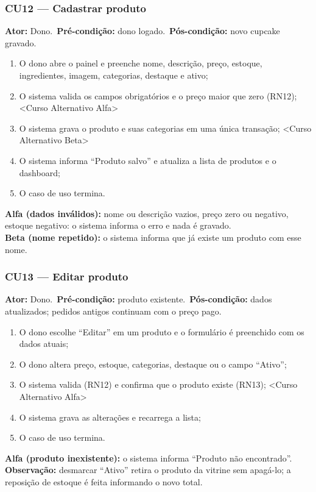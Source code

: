 \documentclass[12pt]{article}
\begin{document}
\subsubsection{CU12 --- Cadastrar produto}
\textbf{Ator:} Dono.\ \textbf{Pré-condição:} dono logado.\ \textbf{Pós-condição:} novo cupcake gravado.
\begin{enumerate}[nosep]
\item O dono abre o painel e preenche nome, descrição, preço, estoque, ingredientes, imagem, categorias, destaque e ativo;
\item O sistema valida os campos obrigatórios e o preço maior que zero (RN12); <Curso Alternativo Alfa>
\item O sistema grava o produto e suas categorias em uma única transação; <Curso Alternativo Beta>
\item O sistema informa ``Produto salvo'' e atualiza a lista de produtos e o dashboard;
\item O caso de uso termina.
\end{enumerate}
\textbf{Alfa (dados inválidos):} nome ou descrição vazios, preço zero ou negativo, estoque negativo: o sistema informa o erro e nada é gravado.\\
\textbf{Beta (nome repetido):} o sistema informa que já existe um produto com esse nome.

\subsubsection{CU13 --- Editar produto}
\textbf{Ator:} Dono.\ \textbf{Pré-condição:} produto existente.\ \textbf{Pós-condição:} dados atualizados; pedidos antigos continuam com o preço pago.
\begin{enumerate}[nosep]
\item O dono escolhe ``Editar'' em um produto e o formulário é preenchido com os dados atuais;
\item O dono altera preço, estoque, categorias, destaque ou o campo ``Ativo'';
\item O sistema valida (RN12) e confirma que o produto existe (RN13); <Curso Alternativo Alfa>
\item O sistema grava as alterações e recarrega a lista;
\item O caso de uso termina.
\end{enumerate}
\textbf{Alfa (produto inexistente):} o sistema informa ``Produto não encontrado''.\\
\textbf{Observação:} desmarcar ``Ativo'' retira o produto da vitrine sem apagá-lo; a reposição de estoque é feita informando o novo total.
\end{document}
